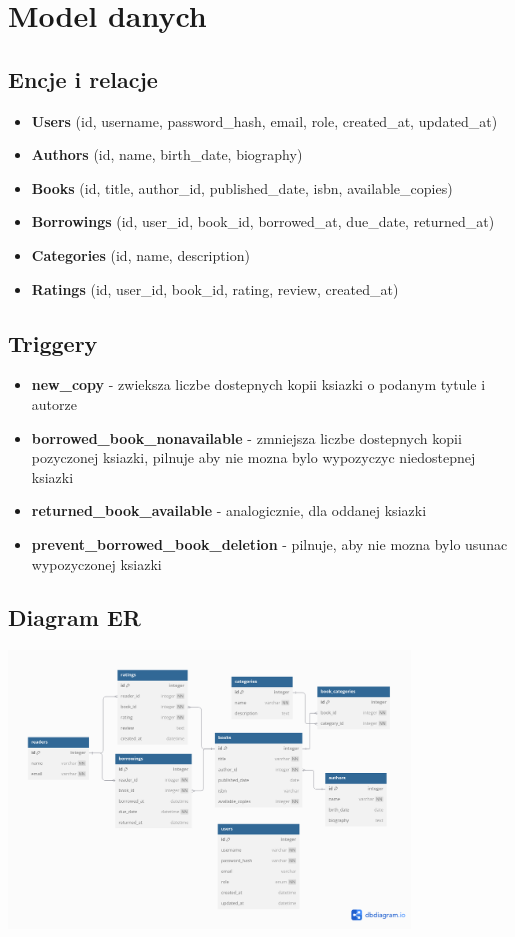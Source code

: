 \documentclass{article}
\begin{document}
\section*{Model danych}
\subsection*{Encje i relacje}
\begin{itemize}
    \item \textbf{Users} (id, username, password\_hash, email, role, created\_at, updated\_at)
    \item \textbf{Authors} (id, name, birth\_date, biography)
    \item \textbf{Books} (id, title, author\_id, published\_date, isbn, available\_copies)
    \item \textbf{Borrowings} (id, user\_id, book\_id, borrowed\_at, due\_date, returned\_at)
    \item \textbf{Categories} (id, name, description)
    \item \textbf{Ratings} (id, user\_id, book\_id, rating, review, created\_at)
\end{itemize}

\subsection*{Triggery}
\begin{itemize}
    \item \textbf{new\_copy} - zwieksza liczbe dostepnych kopii ksiazki o podanym tytule i autorze
    \item \textbf{borrowed\_book\_nonavailable} - zmniejsza liczbe dostepnych kopii pozyczonej ksiazki, pilnuje aby nie mozna bylo wypozyczyc niedostepnej ksiazki
    \item \textbf{returned\_book\_available} - analogicznie, dla oddanej ksiazki
    \item \textbf{prevent\_borrowed\_book\_deletion} - pilnuje, aby nie mozna bylo usunac wypozyczonej ksiazki
\end{itemize}

\subsection*{Diagram ER}
\begin{center}
    \includegraphics[width=0.8\textwidth]{diagram.png}
\end{center}
\end{document}
